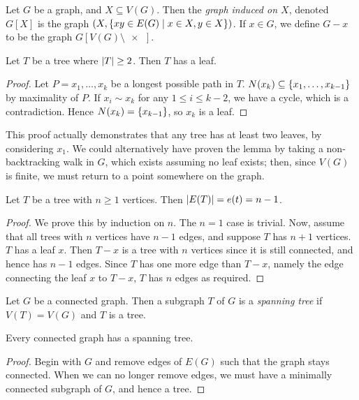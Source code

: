\begin{definition}
	Let \( G \) be a graph, and \( X \subseteq V(G) \).
	Then the \emph{graph induced on \( X \)}, denoted \( G[X] \) is the graph \( (X, \qty{xy \in E(G) \mid x \in X, y \in X}) \).
	If \( x \in G \), we define \( G - x \) to be the graph \( G[V(G) \setminus \qty{x}] \).
\end{definition}
\begin{proposition}
	Let \( T \) be a tree where \( \abs{T} \geq 2 \).
	Then \( T \) has a leaf.
\end{proposition}
\begin{proof}
	Let \( P = x_1, \dots, x_k \) be a longest possible path in \( T \).
	\( N(x_k) \subseteq \qty{x_1, \dots, x_{k-1}} \) by maximality of \( P \).
	If \( x_i \sim x_k \) for any \( 1 \leq i \leq k - 2 \), we have a cycle, which is a contradiction.
	Hence \( N(x_k) = \qty{x_{k-1}} \), so \( x_k \) is a leaf.
\end{proof}
\begin{remark}
	This proof actually demonstrates that any tree has at least two leaves, by considering \( x_1 \).
	We could alternatively have proven the lemma by taking a non-backtracking walk in \( G \), which exists assuming no leaf exists; then, since \( V(G) \) is finite, we must return to a point somewhere on the graph.
\end{remark}
\begin{proposition}
	Let \( T \) be a tree with \( n \geq 1 \) vertices.
	Then \( \abs{E(T)} = e(t) = n - 1 \).
\end{proposition}
\begin{proof}
	We prove this by induction on \( n \).
	The \( n = 1 \) case is trivial.
	Now, assume that all trees with \( n \) vertices have \( n - 1 \) edges, and suppose \( T \) has \( n + 1 \) vertices.
	\( T \) has a leaf \( x \).
	Then \( T - x \) is a tree with \( n \) vertices since it is still connected, and hence has \( n - 1 \) edges.
	Since \( T \) has one more edge than \( T - x \), namely the edge connecting the leaf \( x \) to \( T - x \), \( T \) has \( n \) edges as required.
\end{proof}
\begin{definition}
	Let \( G \) be a connected graph.
	Then a subgraph \( T \) of \( G \) is a \emph{spanning tree} if \( V(T) = V(G) \) and \( T \) is a tree.
\end{definition}
\begin{proposition}
	Every connected graph has a spanning tree.
\end{proposition}
\begin{proof}
	Begin with \( G \) and remove edges of \( E(G) \) such that the graph stays connected.
	When we can no longer remove edges, we must have a minimally connected subgraph of \( G \), and hence a tree.
\end{proof}


